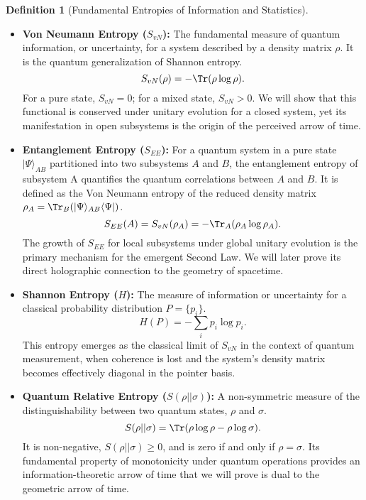 \documentclass[11pt, letterpaper]{report}
\theoremstyle{plain} %
\theoremstyle{definition} %
\newtheorem{definition}{Definition}[chapter]
\theoremstyle{remark} %
\begin{document}
\begin{definition}[Fundamental Entropies of Information and Statistics]~
\begin{itemize}
    \item \textbf{Von Neumann Entropy ($S_{vN}$):} The fundamental measure of quantum information, or uncertainty, for a system described by a density matrix $\rho$. It is the quantum generalization of Shannon entropy.
    \begin{equation}
        S_{vN}(\rho) = -\Tr(\rho \log \rho).
    \end{equation}
    For a pure state, $S_{vN}=0$; for a mixed state, $S_{vN}>0$. We will show that this functional is conserved under unitary evolution for a closed system, yet its manifestation in open subsystems is the origin of the perceived arrow of time.

    \item \textbf{Entanglement Entropy ($S_{EE}$):} For a quantum system in a pure state $|\Psi\rangle_{AB}$ partitioned into two subsystems $A$ and $B$, the entanglement entropy of subsystem A quantifies the quantum correlations between $A$ and $B$. It is defined as the Von Neumann entropy of the reduced density matrix $\rho_A = \Tr_B(|\Psi\rangle_{AB}\langle\Psi|)$.
    \begin{equation}
        S_{EE}(A) = S_{vN}(\rho_A) = -\Tr_A(\rho_A \log \rho_A).
    \end{equation}
    The growth of $S_{EE}$ for local subsystems under global unitary evolution is the primary mechanism for the emergent Second Law. We will later prove its direct holographic connection to the geometry of spacetime.

    \item \textbf{Shannon Entropy ($H$):} The measure of information or uncertainty for a classical probability distribution $P = \{p_i\}$.
    \begin{equation}
        H(P) = -\sum_i p_i \log p_i.
    \end{equation}
    This entropy emerges as the classical limit of $S_{vN}$ in the context of quantum measurement, when coherence is lost and the system's density matrix becomes effectively diagonal in the pointer basis.

    \item \textbf{Quantum Relative Entropy ($S(\rho||\sigma)$):} A non-symmetric measure of the distinguishability between two quantum states, $\rho$ and $\sigma$.
    \begin{equation}
        S(\rho||\sigma) = \Tr(\rho \log \rho - \rho \log \sigma).
    \end{equation}
    It is non-negative, $S(\rho||\sigma) \ge 0$, and is zero if and only if $\rho=\sigma$. Its fundamental property of monotonicity under quantum operations provides an information-theoretic arrow of time that we will prove is dual to the geometric arrow of time.


\end{itemize}
\end{definition}
\end{document}
